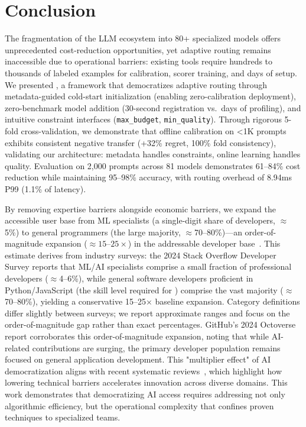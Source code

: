 
\section{Conclusion}
\label{sec:conclusion}

The fragmentation of the LLM ecosystem into 80+ specialized models offers unprecedented cost-reduction opportunities, yet adaptive routing remains inaccessible due to operational barriers: existing tools require hundreds to thousands of labeled examples for calibration, scorer training, and days of setup. We presented \ours{}, a framework that democratizes adaptive routing through metadata-guided cold-start initialization (enabling zero-calibration deployment), zero-benchmark model addition (30-second registration vs.\ days of profiling), and intuitive constraint interfaces (\texttt{max\_budget}, \texttt{min\_quality}). Through rigorous 5-fold cross-validation, we demonstrate that offline calibration on <1K prompts exhibits consistent negative transfer (+32\% regret, 100\% fold consistency), validating our architecture: metadata handles constraints, online learning handles quality. Evaluation on 2,000 prompts across 81 models demonstrates 61--84\% cost reduction while maintaining 95--98\% accuracy, with routing overhead of 8.94ms P99 (1.1\% of latency).

By removing expertise barriers alongside economic barriers, we expand the accessible user base from ML specialists (a single-digit share of developers, $\approx$5\%) to general programmers (the large majority, $\approx$70--80\%)---an order-of-magnitude expansion ($\approx 15$--$25\times$) in the addressable developer base~\cite{stackoverflow2024survey,github2025developer,evansdata2024population}. This estimate derives from industry surveys: the 2024 Stack Overflow Developer Survey reports that ML/AI specialists comprise a small fraction of professional developers ($\approx$4--6\%), while general software developers proficient in Python/JavaScript (the skill level required for \ours{}) comprise the vast majority ($\approx$70--80\%), yielding a conservative 15--25$\times$ baseline expansion. Category definitions differ slightly between surveys; we report approximate ranges and focus on the order-of-magnitude gap rather than exact percentages. GitHub's 2024 Octoverse report corroborates this order-of-magnitude expansion, noting that while AI-related contributions are surging, the primary developer population remains focused on general application development. This "multiplier effect" of AI democratization aligns with recent systematic reviews~\cite{chan2025democratizing}, which highlight how lowering technical barriers accelerates innovation across diverse domains. This work demonstrates that democratizing AI access requires addressing not only algorithmic efficiency, but the operational complexity that confines proven techniques to specialized teams.

